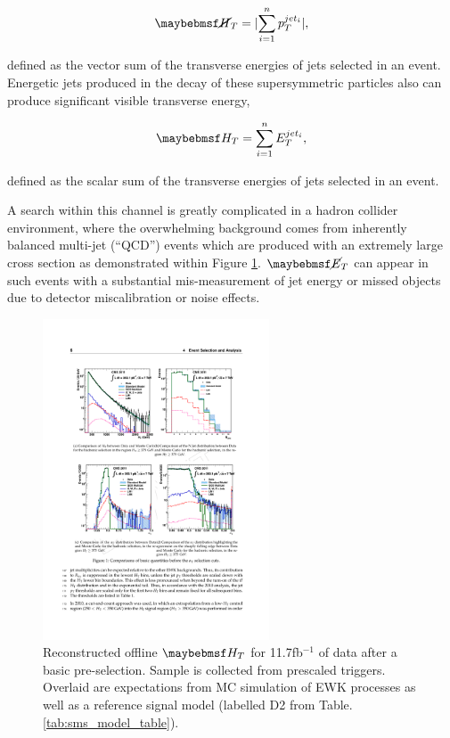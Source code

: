 \begin{equation}
\mht =  \lvert \sum_{i=1}^{n} p_{T}^{jet_{i}} \rvert,
\end{equation}

defined as the vector sum of the transverse energies of jets selected in an event. Energetic jets produced in the decay of these supersymmetric particles also 
can produce significant visible transverse energy, 

\begin{equation}
\theht = \sum_{i=1}^{n} E_{T}^{jet_{i}},
\end{equation}

defined as the scalar sum of the transverse energies of jets selected in an event.

A search within this channel is greatly complicated in a hadron collider environment, where the overwhelming background comes from inherently balanced multi-jet (``QCD'') events which are produced with an extremely large cross section as demonstrated within Figure \ref{fig:htqcdbackground}. $\met$ can appear in such events with a substantial mis-measurement of jet energy or missed objects due to detector miscalibration or noise effects. 

\begin{figure}[!h]

\centering
\includegraphics[width=0.60\textwidth]{plots/nocuts_htdistribution.pdf}
\caption[Reconstructed offline \theht for 11.7fb$^{-1}$ of data after a basic pre-selection.]{Reconstructed offline $\theht$ for 11.7fb$^{-1}$ of data after a basic pre-selection. Sample is collected from prescaled \theht triggers. Overlaid are expectations from MC simulation of \ac{EWK} processes as well as a reference signal model (labelled D2 from Table.\ref{tab:sms_model_table}).}  
\label{fig:htqcdbackground}
\end{figure}

